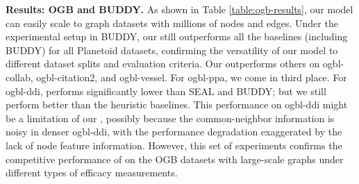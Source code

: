 \documentclass[sigconf, nonacm]{acmart}
\newcommand{\posplus}{\xspace}
\newcommand{\first}{\textcolor[rgb]{0.9, 0.17, 0.31}}
\newcommand{\second}{\textcolor[rgb]{0.0, 0.0, 1.0}}
\newcommand{\third}{\textcolor[rgb]{0.55, 0.0, 0.55}}
\begin{document}
\begin{table*}
{\begin{tabular}{l|c|c|c|c|c|c|c|c}
\bottomrule
\end{tabular}
}
\caption[Results for \posplus in comparison to the methodology set in BUDDY \cite{chamberlain2023graph}]{Results for \posplus in comparison to the datasets and baselines chosen in BUDDY \cite{chamberlain2023graph}. The top three performing models are \textbf{\first{First}}, \textbf{\second{Second}}, and \textbf{\third{Third}}.}
\label{table:ogb-results}

\end{table*}



\vskip 1mm
\noindent \textbf{Results: OGB and BUDDY.} As shown in Table \ref{table:ogb-results}, our \posplus model can easily scale to graph datasets with millions of nodes and edges. Under the experimental setup in BUDDY, our \posplus still outperforms all the baselines (including BUDDY) for all Planetoid datasets, confirming the versatility of our model to different dataset splits and evaluation criteria. Our \posplus outperforms others on ogbl-collab, ogbl-citation2, and ogbl-vessel. For ogbl-ppa, we come in third place. For ogbl-ddi, \posplus performs significantly lower than SEAL and BUDDY; but we still perform better than the heuristic baselines. This performance on ogbl-ddi might be a limitation of our \posplus, possibly because the common-neighbor information is noisy in denser ogbl-ddi, with the performance degradation exaggerated by the lack of node feature information. However, this set of experiments confirms the competitive performance of \posplus on the OGB datasets with large-scale graphs under different types of efficacy measurements.
\end{document}
